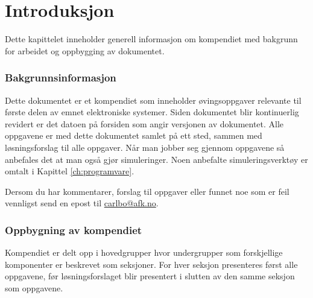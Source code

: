 \chapter{Introduksjon}
\label{ch:introduksjon}
Dette kapittelet inneholder generell informasjon om kompendiet med bakgrunn for arbeidet og oppbygging av dokumentet.

\subsection{Bakgrunnsinformasjon}
Dette dokumentet er et kompendiet som inneholder øvingsoppgaver relevante til første delen av emnet elektroniske systemer. Siden dokumentet blir kontinuerlig revidert er det datoen på forsiden som angir versjonen av dokumentet. Alle oppgavene er med dette dokumentet samlet på ett sted, sammen med løsningsforslag til alle oppgaver. Når man jobber seg gjennom oppgavene så anbefales det at man også gjør simuleringer. Noen anbefalte simuleringsverktøy er omtalt i Kapittel \ref{ch:programvare}.

Dersom du har kommentarer, forslag til oppgaver eller funnet noe som er feil vennligst send en epost til \href{mailto:carlbo@afk.no}{carlbo@afk.no}.

\subsection{Oppbygning av kompendiet}
Kompendiet er delt opp i hovedgrupper hvor undergrupper som forskjellige komponenter er beskrevet som seksjoner. For hver seksjon presenteres først alle oppgavene, før løsningsforslaget blir presentert i slutten av den samme seksjon som oppgavene.